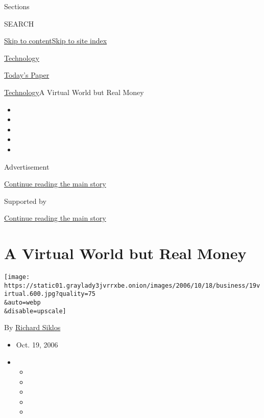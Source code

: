 Sections

SEARCH

\protect\hyperlink{site-content}{Skip to
content}\protect\hyperlink{site-index}{Skip to site index}

\href{https://www.nytimes3xbfgragh.onion/section/technology}{Technology}

\href{https://myaccount.nytimes3xbfgragh.onion/auth/login?response_type=cookie\&client_id=vi}{}

\href{https://www.nytimes3xbfgragh.onion/section/todayspaper}{Today's
Paper}

\href{/section/technology}{Technology}\textbar{}A Virtual World but Real
Money

\begin{itemize}
\item
\item
\item
\item
\item
\end{itemize}

Advertisement

\protect\hyperlink{after-top}{Continue reading the main story}

Supported by

\protect\hyperlink{after-sponsor}{Continue reading the main story}

\hypertarget{a-virtual-world-but-real-money}{%
\section{A Virtual World but Real
Money}\label{a-virtual-world-but-real-money}}

\texttt{[image: https://static01.graylady3jvrrxbe.onion/images/2006/10/18/business/19virtual.600.jpg?quality=75\\\&auto=webp\\\&disable=upscale]}

By \href{https://www.nytimes3xbfgragh.onion/by/richard-siklos}{Richard
Siklos}

\begin{itemize}
\item
  Oct. 19, 2006
\item
  \begin{itemize}
  \item
  \item
  \item
  \item
  \item
  \end{itemize}
\end{itemize}

